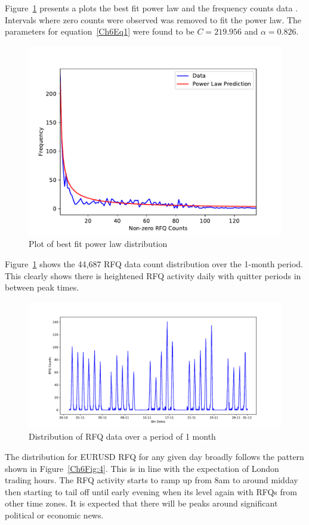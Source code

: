 Figure~\ref{Ch6Fig:2} presents a plots the best fit power law and the frequency counts data . Intervals where zero counts were observed was removed to fit the power law. The parameters for equation~\ref{Ch6Eq1} were found to be $C = 219.956$ and $\alpha = 0.826$.

\begin{figure}[!ht]\centering
    \includegraphics[width=0.8\linewidth]{./figures/Ch6fig2.pdf}
    \caption{Plot of best fit power law distribution}\label{Ch6Fig:2}
\end{figure}


Figure~\ref{Ch6Fig:2} shows the 44,687 RFQ data count distribution over the 1-month period. This clearly shows there is heightened RFQ activity daily with quitter periods in between peak times.

\begin{figure}[!ht]\centering
    \includegraphics[width=0.8\linewidth]{./figures/Ch6fig3.pdf}
    \caption{Distribution of RFQ data over a period of 1 month}\label{Ch6Fig:3}
\end{figure}

The distribution for EURUSD RFQ for any given day broadly follows the pattern shown in Figure~\ref{Ch6Fig:4}. This is in line with the expectation of London trading hours. The RFQ activity starts to ramp up from 8am to around midday then starting to tail off until early evening when its level again with RFQs from other time zones. It is expected that there will be peaks around significant political or economic news.

